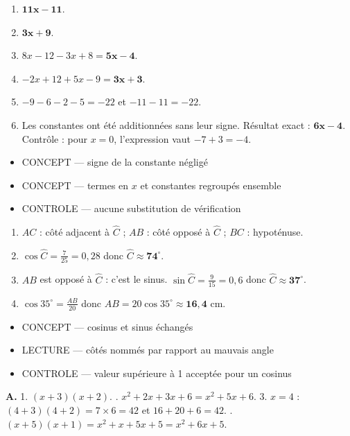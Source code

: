 \documentclass[10pt,a4paper]{article}
\begin{document}
\begin{enumerate}
\item $\mathbf{11x-11}$.
\item $\mathbf{3x+9}$.
\item $8x-12-3x+8=\mathbf{5x-4}$.
\item $-2x+12+5x-9=\mathbf{3x+3}$.
\item $-9-6-2-5=-22$ et $-11-11=-22$.
\item Les constantes ont été additionnées sans leur signe. Résultat exact : $\mathbf{6x-4}$. Contrôle : pour $x=0$, l'expression vaut $-7+3=-4$.
\end{enumerate}
\begin{itemize}
\item \textsc{CONCEPT} --- signe de la constante négligé
\item \textsc{CONCEPT} --- termes en $x$ et constantes regroupés ensemble
\item \textsc{CONTROLE} --- aucune substitution de vérification
\end{itemize}
\begin{enumerate}
\item $AC$ : côté adjacent à $\widehat{C}$ ; $AB$ : côté opposé à $\widehat{C}$ ; $BC$ : hypoténuse.
\item $\cos\widehat{C}=\frac{7}{25}=0{,}28$ donc $\widehat{C}\approx \mathbf{74^\circ}$.
\item $AB$ est opposé à $\widehat{C}$ : c'est le sinus. $\sin\widehat{C}=\frac{9}{15}=0{,}6$ donc $\widehat{C}\approx \mathbf{37^\circ}$.
\item $\cos 35^\circ = \frac{AB}{20}$ donc $AB = 20\cos 35^\circ \approx \mathbf{16{,}4}$ cm.
\end{enumerate}
\begin{itemize}
\item \textsc{CONCEPT} --- cosinus et sinus échangés
\item \textsc{LECTURE} --- côtés nommés par rapport au mauvais angle
\item \textsc{CONTROLE} --- valeur supérieure à 1 acceptée pour un cosinus
\end{itemize}

\textbf{A.} 1. $(x+3)(x+2)$. . $x^2 + 2x + 3x + 6 = x^2 + 5x + 6$.
3. $x=4$ : $(4+3)(4+2)=7\times 6=42$ et $16+20+6=42$. . $(x+5)(x+1)=x^2+x+5x+5=x^2+6x+5$.
\end{document}
